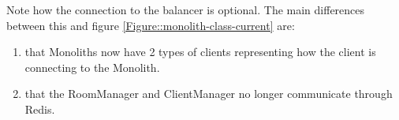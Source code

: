 Note how the connection to the balancer is optional. The main differences between this and figure \ref{Figure::monolith-class-current} are:
\begin{enumerate}
  \item that Monoliths now have 2 types of clients representing how the client is connecting to the Monolith.
  \item that the RoomManager and ClientManager no longer communicate through Redis.
\end{enumerate}